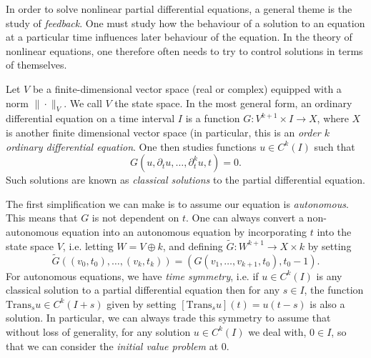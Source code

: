 In order to solve nonlinear partial differential equations, a general theme is the study of \emph{feedback}. One must study how the behaviour of a solution to an equation at a particular time influences later behaviour of the equation. In the theory of nonlinear equations, one therefore often needs to try to control solutions in terms of themselves.

Let $V$ be a finite-dimensional vector space (real or complex) equipped with a norm $\| \cdot \|_V$. We call $V$ the state space. In the most general form, an ordinary differential equation on a time interval $I$ is a function $G: V^{k+1} \times I \to X$, where $X$ is another finite dimensional vector space (in particular, this is an \emph{order $k$ ordinary differential equation}. One then studies functions $u \in C^k(I)$ such that
%
\[ G(u,\partial_t u, \dots, \partial_t^k u,t) = 0. \]
%
Such solutions are known as \emph{classical solutions} to the partial differential equation.

The first simplification we can make is to assume our equation is \emph{autonomous}. This means that $G$ is not dependent on $t$. One can always convert a non-autonomous equation into an autonomous equation by incorporating $t$ into the state space $V$, i.e. letting $W = V \oplus k$, and defining $\tilde{G}: W^{k+1} \to X \times k$ by setting
%
\[ \tilde{G}((v_0,t_0),\dots,(v_k,t_k)) = (G(v_1,\dots,v_{k+1},t_0),t_0 - 1). \]
%
For autonomous equations, we have \emph{time symmetry}, i.e. if $u \in C^k(I)$ is any classical solution to a partial differential equation then for any $s \in I$, the function $\text{Trans}_s u \in C^k(I + s)$ given by setting $[\text{Trans}_s u](t) = u(t - s)$ is also a solution. In particular, we can always trade this symmetry to assume that without loss of generality, for any solution $u \in C^k(I)$ we deal with, $0 \in I$, so that we can consider the \emph{initial value problem} at $0$.

